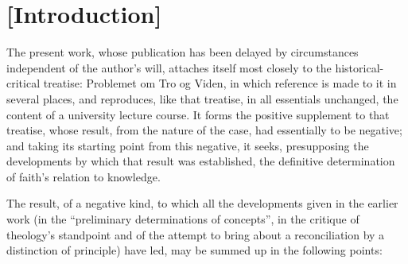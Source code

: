 \documentclass[12pt,a4paper]{book}
\begin{document}

\chapter*{[Introduction]}

The present work, whose publication has been delayed by circumstances
independent of the author's will, attaches itself most closely to the
historical-critical treatise: Problemet om Tro og Viden, in which
reference is made to it in several places, and reproduces, like that treatise,
in all essentials unchanged, the content of a university lecture course. It
forms the positive supplement to that treatise, whose result, from the nature
of the case, had essentially to be negative; and taking its starting point
from this negative, it seeks, presupposing the developments by which that
result was established, the definitive determination of faith's relation to
knowledge.

The result, of a negative kind, to which all the developments given in the
earlier work (in the ``preliminary determinations of concepts'', in the
critique of theology's standpoint and of the attempt to bring about a
reconciliation by a distinction of principle) have led, may be summed up in
the following points:
\end{document}
